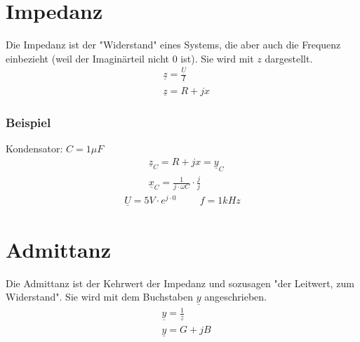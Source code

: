 \section{Impedanz}
Die Impedanz ist der "Widerstand" eines Systems, die aber auch die Frequenz einbezieht (weil der Imaginärteil nicht $0$ ist). Sie wird mit $z$ dargestellt.
\begin{align}
    &\underline{z}=\frac{\underline{U}}{\underline{I}}  \\
    &\underline{z}=R+jx
\end{align}

\subsubsection*{Beispiel}
Kondensator: $C=1\mu F$\\
\begin{align}
    &\underline{z}_C=R+jx=\underline{y}_C                       \\
    &\underline{x}_C=\frac{1}{j\cdot\omega C}\cdot\frac{j}{j}
\end{align}
\begin{align}
    \underline{U}=5V\cdot e^{j\cdot 0} \hspace{1cm} f=1kHz
\end{align}

\section{Admittanz}
Die Admittanz ist der Kehrwert der Impedanz und sozusagen "der Leitwert, zum Widerstand". Sie wird mit dem Buchstaben $\underline{y}$ angeschrieben.
\begin{align}
    &\underline{y}=\frac{1}{\underline{z}}  \\
    &\underline{y}=G+jB
\end{align}